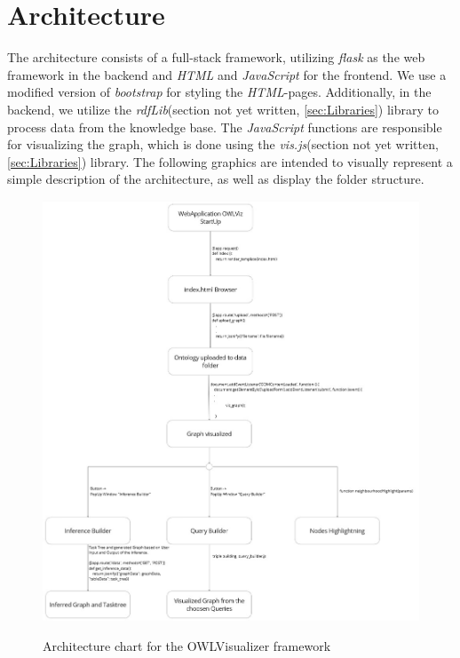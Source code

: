 \section{Architecture}
\label{sec:Architecture}

The architecture consists of a full-stack framework, utilizing \textit{flask} as the web framework in the backend and \textit{HTML} and \textit{JavaScript} for the frontend. 
We use a modified version of \textit{bootstrap} for styling the \textit{HTML}-pages. Additionally, in the backend, we utilize the \textit{rdfLib}(section not yet written, 
\ref{sec:Libraries}) library to process data from the knowledge base. The \textit{JavaScript} functions are responsible for visualizing the graph, which is done using the \textit{vis.js}(section not yet written, 
\ref{sec:Libraries}) library. The following graphics are intended to visually represent a simple description of the architecture, as well as display the folder structure.
\begin{figure}[H]
    \includegraphics[scale=0.35]{Graphics/OWLViz_architecture.jpg}
    \label{fig:OWLViz_architecture}
    \caption{Architecture chart for the OWLVisualizer framework}
\end{figure}

